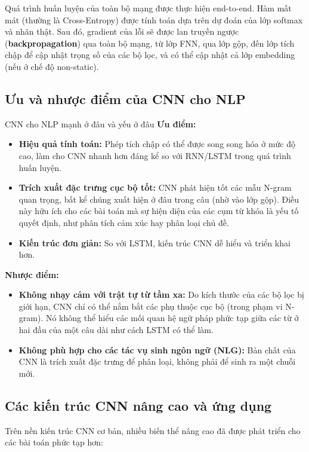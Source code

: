 Quá trình huấn luyện của toàn bộ mạng được thực hiện end-to-end. Hàm mất mát (thường là Cross-Entropy) được tính toán dựa trên dự đoán của lớp softmax và nhãn thật. Sau đó, gradient của lỗi sẽ được lan truyền ngược (\textbf{backpropagation}) qua toàn bộ mạng, từ lớp FNN, qua lớp gộp, đến lớp tích chập để cập nhật trọng số của các bộ lọc, và có thể cập nhật cả lớp embedding (nếu ở chế độ non-static).

\subsection{Ưu và nhược điểm của CNN cho NLP}
\begin{assess}{CNN cho NLP mạnh ở đâu và yếu ở đâu}
\textbf{Ưu điểm:}
\begin{itemize}
    \item \textbf{Hiệu quả tính toán:} Phép tích chập có thể được song song hóa ở mức độ cao, làm cho CNN nhanh hơn đáng kể so với RNN/LSTM trong quá trình huấn luyện.
    \item \textbf{Trích xuất đặc trưng cục bộ tốt:} CNN phát hiện tốt các mẫu N-gram quan trọng, bất kể chúng xuất hiện ở đâu trong câu (nhờ vào lớp gộp). Điều này hữu ích cho các bài toán mà sự hiện diện của các cụm từ khóa là yếu tố quyết định, như phân tích cảm xúc hay phân loại chủ đề.
    \item \textbf{Kiến trúc đơn giản:} So với LSTM, kiến trúc CNN dễ hiểu và triển khai hơn.
\end{itemize}
\textbf{Nhược điểm:}
\begin{itemize}
    \item \textbf{Không nhạy cảm với trật tự từ tầm xa:} Do kích thước của các bộ lọc bị giới hạn, CNN chỉ có thể nắm bắt các phụ thuộc cục bộ (trong phạm vi N-gram). Nó không thể hiểu các mối quan hệ ngữ pháp phức tạp giữa các từ ở hai đầu của một câu dài như cách LSTM có thể làm.
    \item \textbf{Không phù hợp cho các tác vụ sinh ngôn ngữ (NLG):} Bản chất của CNN là trích xuất đặc trưng để phân loại, không phải để sinh ra một chuỗi mới.
\end{itemize}
\end{assess}
\subsection{Các kiến trúc CNN nâng cao và ứng dụng}
Trên nền kiến trúc CNN cơ bản, nhiều biến thể nâng cao đã được phát triển cho các bài toán phức tạp hơn:

